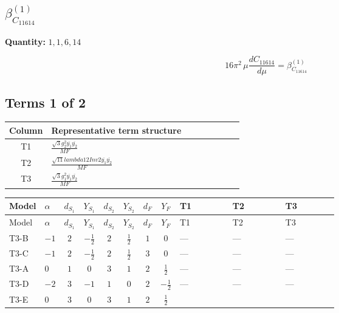 \documentclass[8pt]{article}
\begin{document}
\begin{landscape}
\section*{$\beta_{C_{11614}}^{(1)}$}
\noindent\textbf{Quantity: }$\mathrm{1,1,6,14}$\par\smallskip
\[16\pi^2\,\mu\frac{d C_{11614}}{d\mu}=\beta_{C_{11614}}^{(1)}\]
\subsection*{Terms 1 of 2}
\begin{center}
\begin{tabular}{@{}c >{\raggedright\arraybackslash}p{0.82\linewidth}@{}}
\toprule
Column & Representative term structure \\
\midrule
T1 & \(\displaystyle \frac{\sqrt{3} g_{2}^{2} \overline{y_{1}} \overline{y_{2}}}{MF}\) \\
\midrule
T2 & \(\displaystyle \frac{\sqrt{11} lambda12Inv2 \overline{y_{1}} \overline{y_{2}}}{MF}\) \\
\midrule
T3 & \(\displaystyle \frac{\sqrt{3} g_{1}^{2} \overline{y_{1}} \overline{y_{2}}}{MF}\) \\
\midrule
\bottomrule
\end{tabular}
\end{center}
\smallskip
\tiny
\begin{longtable}{@{}llcccccc >{\raggedright\arraybackslash}p{0.21\linewidth} >{\raggedright\arraybackslash}p{0.21\linewidth} >{\raggedright\arraybackslash}p{0.21\linewidth}@{}}
\toprule
Model & $\alpha$ & $d_{S_1}$ & $Y_{S_1}$ & $d_{S_2}$ & $Y_{S_2}$ & $d_F$ & $Y_F$ & T1 & T2 & T3 \\
\midrule
\endfirsthead
\toprule
Model & $\alpha$ & $d_{S_1}$ & $Y_{S_1}$ & $d_{S_2}$ & $Y_{S_2}$ & $d_F$ & $Y_F$ & T1 & T2 & T3 \\
\midrule
\endhead
T3-B & $-1$ & $2$ & $-\frac{1}{2}$ & $2$ & $\frac{1}{2}$ & $1$ & $0$ & --- & --- & --- \\
\midrule
T3-C & $-1$ & $2$ & $-\frac{1}{2}$ & $2$ & $\frac{1}{2}$ & $3$ & $0$ & --- & --- & --- \\
\midrule
T3-A & $0$ & $1$ & $0$ & $3$ & $1$ & $2$ & $\frac{1}{2}$ & --- & --- & --- \\
\midrule
T3-D & $-2$ & $3$ & $-1$ & $1$ & $0$ & $2$ & $-\frac{1}{2}$ & --- & --- & --- \\
\midrule
T3-E & $0$ & $3$ & $0$ & $3$ & $1$ & $2$ & $\frac{1}{2}$ & \scriptsize\adjustbox{max width=\linewidth}{$\begin{gathered} - \frac{11 \sqrt{3} g_{2}^{2} \overline{y_{1}} \overline{y_{2}}}{8 MF}\end{gathered}$} & \scriptsize\adjustbox{max width=\linewidth}{$\begin{gathered} - \frac{3 \sqrt{11} lambda12Inv2 \overline{y_{1}} \overline{y_{2}}}{22 MF}\end{gathered}$} & \scriptsize\adjustbox{max width=\linewidth}{$\begin{gathered} - \frac{\sqrt{3} g_{1}^{2} \overline{y_{1}} \overline{y_{2}}}{8 MF}\end{gathered}$} \\

\end{longtable}
\end{landscape}
\end{document}
